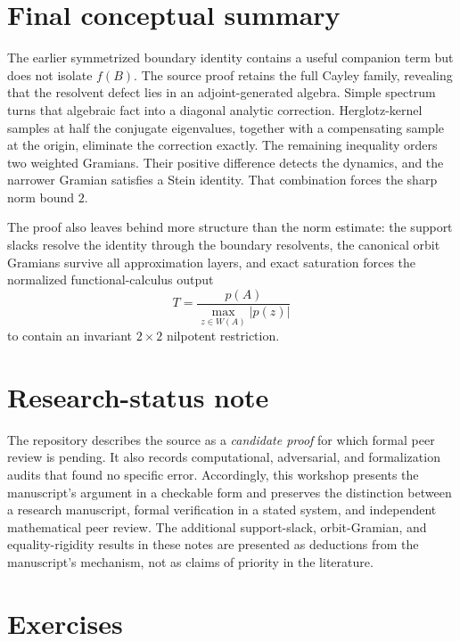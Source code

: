 \documentclass[11pt,oneside,openany]{book}
\theoremstyle{definition}
\theoremstyle{remark}
\newcommand{\abs}[1]{\left\lvert #1\right\rvert}
\begin{document}
\section{Final conceptual summary}

\begin{proofmap}
The earlier symmetrized boundary identity contains a useful companion
term but does not isolate \(f(B)\).  The source proof retains the full
Cayley family, revealing that the resolvent defect lies in an
adjoint-generated algebra.  Simple spectrum turns that algebraic fact
into a diagonal analytic correction.  Herglotz-kernel samples at half
the conjugate eigenvalues, together with a compensating sample at the
origin, eliminate the correction exactly.  The remaining inequality
orders two weighted Gramians.  Their positive difference detects the
dynamics, and the narrower Gramian satisfies a Stein identity.  That
combination forces the sharp norm bound \(2\).

The proof also leaves behind more structure than the norm estimate:
the support slacks resolve the identity through the boundary
resolvents, the canonical orbit Gramians survive all approximation
layers, and exact saturation forces the normalized functional-calculus
output
\[
  T=\frac{p(A)}{\max_{z\in W(A)}\abs{p(z)}}
\]
to contain an invariant \(2\times2\) nilpotent restriction.
\end{proofmap}

\section{Research-status note}

The repository describes the source as a \emph{candidate proof} for
which formal peer review is pending.  It also records computational,
adversarial, and formalization audits that found no specific error.
Accordingly, this workshop presents the manuscript's argument in a
checkable form and preserves the distinction between a research
manuscript, formal verification in a stated system, and independent
mathematical peer review.  The additional support-slack, orbit-Gramian,
and equality-rigidity results in these notes are presented as
deductions from the manuscript's mechanism, not as claims of priority
in the literature.

\section{Exercises}
\end{document}
